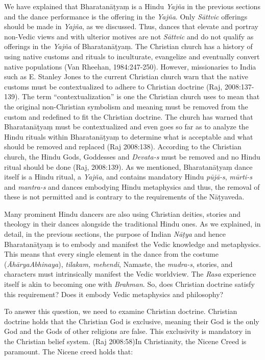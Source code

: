 We have explained that Bharatanāṭyaṃ is a Hindu \textit{Yajña} in the previous sections and the dance performance is the offering in the \textit{Yajña}. Only \textit{Sāttvic} offerings should be made in \textit{Yajña}, as we discussed. Thus, dances that elevate and portray non-Vedic views and with ulterior motives are not \textit{Sāttvic} and do not qualify as offerings in the \textit{Yajña} of Bharatanāṭyaṃ. The Christian church has a history of using native customs and rituals to inculturate, evangelize and eventually convert native populations (Van Rheehan, 1984:247-250). However, missionaries to India such as E. Stanley Jones to the current Christian church warn that the native customs must be contextualized to adhere to Christian doctrine (Raj, 2008:137-139). The term “contextualization” is one the Christian church uses to mean that the original non-Christian symbolism and meaning must be removed from the custom and redefined to fit the Christian doctrine. The church has warned that Bharatanāṭyaṃ must be contextualized and even goes so far as to analyze the Hindu rituals within Bharatanāṭyaṃ to determine what is acceptable and what should be removed and replaced (Raj 2008:138). According to the Christian church, the Hindu Gods, Goddesses and \textit{Devata-s} must be removed and no Hindu ritual should be done (Raj, 2008:139). As we mentioned, Bharatanāṭyaṃ dance itself is a Hindu ritual, a \textit{Yajña}, and contains mandatory Hindu \textit{pūjā-s}, \textit{mūrti-s} and \textit{mantra-s} and dances embodying Hindu metaphysics and thus, the removal of these is not permitted and is contrary to the requirements of the Nāṭyaveda.

\vskip 2pt

Many prominent Hindu dancers are also using Christian deities, stories and theology in their dances alongside the traditional Hindu ones. As we explained, in detail, in the previous sections, the purpose of Indian \textit{Nāṭya }and hence Bharatanāṭyaṃ is to embody and manifest the Vedic knowledge and metaphysics. This means that every single element in the dance from the costume (\textit{ĀhāryaAbhinaya}), \textit{tilakam, mehendi}, Namaste, the \textit{mudra-s}, stories, and characters must intrinsically manifest the Vedic worldview. The \textit{Rasa} experience itself is akin to becoming one with \textit{Brahman}. So, does Christian doctrine satisfy this requirement? Does it embody Vedic metaphysics and philosophy?

\vskip 2pt

To answer this question, we need to examine Christian doctrine. Christian doctrine holds that the Christian God is exclusive, meaning their God is the only God and the Gods of other religions are false. This exclusivity is mandatory in the Christian belief system. (Raj 2008:58)In Christianity, the Nicene Creed is paramount. The Nicene creed holds that:

